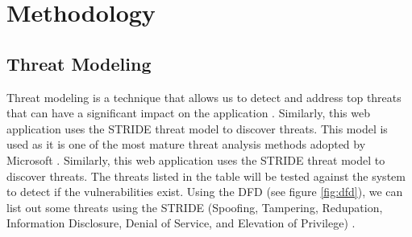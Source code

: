 \chapter{Methodology}
\section{Threat Modeling}
Threat modeling is a technique that allows us to detect and address top threats that can have a significant impact on the application \citep{threat_modeling}. Similarly, this web application uses the STRIDE threat model to discover threats. This model is used as it is one of the most mature threat analysis methods adopted by Microsoft \citep[p.~1]{shevchenko2018threat}. Similarly, this web application uses the STRIDE threat model to discover threats. The threats listed in the table will be tested against the system to detect if the vulnerabilities exist.
Using the DFD (see figure \ref{fig:dfd}), we can list out some threats using the STRIDE (Spoofing, Tampering, Redupation, Information Disclosure, Denial of Service, and Elevation of Privilege) \citep[p.~2]{stride}.

